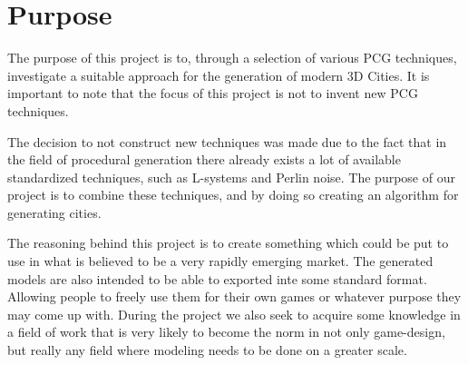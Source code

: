 \section{Purpose}
The purpose of this project is to, through a selection of various PCG techniques, investigate a suitable approach for the generation of modern 3D Cities. 
It is important to note that the focus of this project is not to invent new PCG techniques.  

The decision to not construct new techniques was made due to the fact that in the field of procedural generation there already exists a lot of available standardized techniques, such as L-systems and Perlin noise. 
The purpose of our project is to combine these techniques, and by doing so creating an algorithm for generating cities. 

The reasoning behind this project is to create something which could be put to use in what is believed to be a very rapidly emerging market. 
The generated models are also intended to be able to exported inte some standard format. 
Allowing people to freely use them for their own games or whatever purpose they may come up with. 
During the project we also seek to acquire some knowledge in a field of work that is very likely to become the norm in not only game-design, but really any field where modeling needs to be done on a greater scale. 
